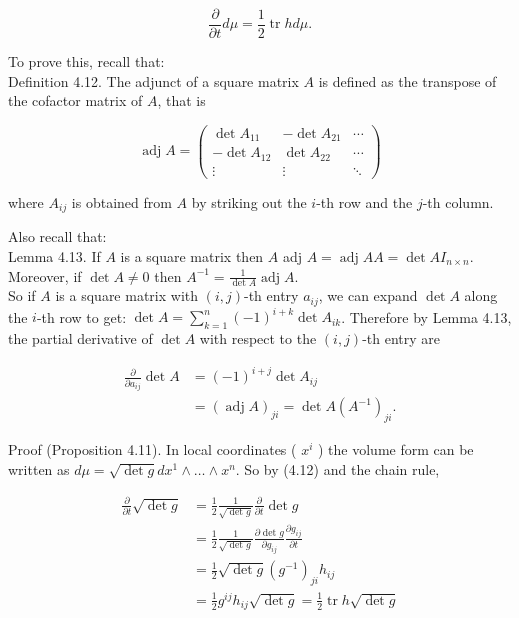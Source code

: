 \documentclass[10pt, letterpaper]{article}
\begin{document}
$$
\frac{\partial}{\partial t} d \mu=\frac{1}{2} \operatorname{tr} h d \mu .
$$

To prove this, recall that:\\
Definition 4.12. The adjunct of a square matrix $A$ is defined as the transpose of the cofactor matrix of $A$, that is

$$
\operatorname{adj} A=\left(\begin{array}{ccc}
\operatorname{det} A_{11} & -\operatorname{det} A_{21} & \cdots \\
-\operatorname{det} A_{12} & \operatorname{det} A_{22} & \cdots \\
\vdots & \vdots & \ddots
\end{array}\right)
$$

where $A_{i j}$ is obtained from $A$ by striking out the $i$-th row and the $j$-th column.

Also recall that:\\
Lemma 4.13. If $A$ is a square matrix then $A$ adj $A=\operatorname{adj} A A=\operatorname{det} A I_{n \times n}$. Moreover, if $\operatorname{det} A \neq 0$ then $A^{-1}=\frac{1}{\operatorname{det} A} \operatorname{adj} A$.\\
So if $A$ is a square matrix with $(i, j)$-th entry $a_{i j}$, we can expand $\operatorname{det} A$ along the $i$-th row to get: $\operatorname{det} A=\sum_{k=1}^{n}(-1)^{i+k} \operatorname{det} A_{i k}$. Therefore by Lemma 4.13, the partial derivative of $\operatorname{det} A$ with respect to the $(i, j)$-th entry are

$$
\begin{aligned}
\frac{\partial}{\partial a_{i j}} \operatorname{det} A & =(-1)^{i+j} \operatorname{det} A_{i j} \\
& =(\operatorname{adj} A)_{j i}=\operatorname{det} A\left(A^{-1}\right)_{j i} .
\end{aligned}
$$

Proof (Proposition 4.11). In local coordinates ( $x^{i}$ ) the volume form can be written as $d \mu=\sqrt{\operatorname{det} g} d x^{1} \wedge \ldots \wedge x^{n}$. So by (4.12) and the chain rule,

$$
\begin{aligned}
\frac{\partial}{\partial t} \sqrt{\operatorname{det} g} & =\frac{1}{2} \frac{1}{\sqrt{\operatorname{det} g}} \frac{\partial}{\partial t} \operatorname{det} g \\
& =\frac{1}{2} \frac{1}{\sqrt{\operatorname{det} g}} \frac{\partial \operatorname{det} g}{\partial g_{i j}} \frac{\partial g_{i j}}{\partial t} \\
& =\frac{1}{2} \sqrt{\operatorname{det} g}\left(g^{-1}\right)_{j i} h_{i j} \\
& =\frac{1}{2} g^{i j} h_{i j} \sqrt{\operatorname{det} g}=\frac{1}{2} \operatorname{tr} h \sqrt{\operatorname{det} g}
\end{aligned}
$$
\end{document}
